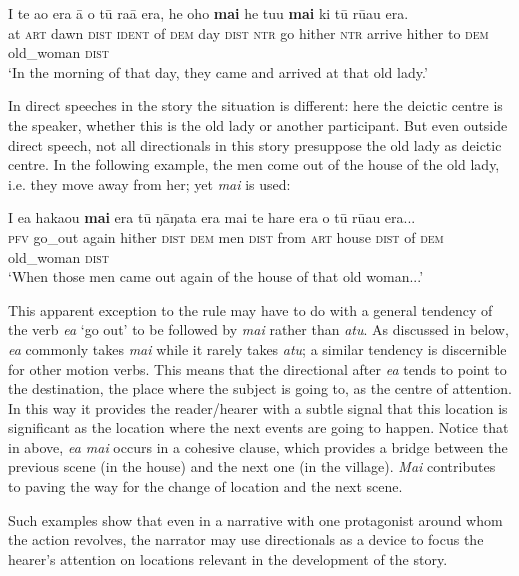 \ea\label{ex:7.135}
\gll {\ꞌ}I te {\ꞌ}ao era {\ꞌ}ā o tū ra{\ꞌ}ā era, he oho \textbf{mai} he tu{\ꞌ}u \textbf{mai}  ki tū rū{\ꞌ}au era.\\
at \textsc{art} dawn \textsc{dist} \textsc{ident} of \textsc{dem} day \textsc{dist} \textsc{ntr} go hither \textsc{ntr} arrive hither  to \textsc{dem} old\_woman \textsc{dist}\\

\glt
‘In the morning of that day, they came and arrived at that old lady.’ \textstyleExampleref{[R368.063]} 
\z

In direct speeches in the story the situation is different: here the deictic centre is the speaker, whether this is the old lady or another participant. But even outside direct speech, not all directionals in this story presuppose the old lady as deictic centre. In the following example, the men come out of the house of the old lady, i.e. they move away from her; yet \textit{mai} is used:

\ea\label{ex:7.136}
\gll I e{\ꞌ}a haka{\ꞌ}ou \textbf{mai} era tū ŋāŋata era mai te hare era  o tū rū{\ꞌ}au era...\\
\textsc{pfv} go\_out again hither \textsc{dist} \textsc{dem} men \textsc{dist} from \textsc{art} house \textsc{dist}  of \textsc{dem} old\_woman \textsc{dist}\\

\glt
‘When those men came out again of the house of that old woman...’ \textstyleExampleref{[R368.056]} 
\z

This apparent exception to the rule may have to do with a general tendency of the verb \textit{e{\ꞌ}a} ‘go out’ to be followed by \textit{mai} rather than \textit{atu}. As discussed in  below, \textit{e{\ꞌ}a} commonly takes \textit{mai} while it rarely takes \textit{atu}; a similar tendency is discernible for other motion verbs. This means that the directional after \textit{e{\ꞌ}a} tends to point to the destination, the place where the subject is going to, as the centre of attention. In this way it provides the reader/hearer with a subtle signal that this location is significant as the location where the next events are going to happen. Notice that in  above, \textit{e{\ꞌ}a mai} occurs in a cohesive clause, which provides a bridge between the previous scene (in the house) and the next one (in the village). \textit{Mai} contributes to paving the way for the change of location and the next scene.

Such examples show that even in a narrative with one protagonist around whom the action revolves, the narrator may use directionals as a device to focus the hearer’s attention on locations relevant in the development of the story.

